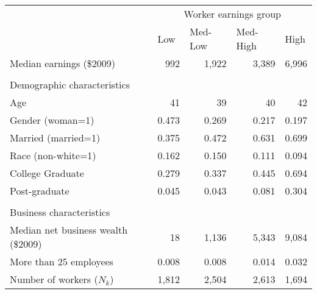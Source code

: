\begin{tabular}{lrrrr}
\toprule
      & \multicolumn{4}{c}{Worker earnings group} \\
\cmidrule{2-5}      & \multicolumn{1}{l}{Low} & \multicolumn{1}{l}{Med-Low} & \multicolumn{1}{l}{Med-High} & \multicolumn{1}{l}{High} \\
\midrule
Median earnings (\$2009) &                  992  &              1,922  &              3,389  &              6,996  \\
      &       &       &       &  \\
Demographic characteristics &       &       &       &  \\
\qquad Age & 41    & 39    & 40    & 42 \\
\qquad Gender (woman=1) & 0.473 & 0.269 & 0.217 & 0.197 \\
\qquad Married (married=1) & 0.375 & 0.472 & 0.631 & 0.699 \\
\qquad Race (non-white=1) & 0.162 & 0.150 & 0.111 & 0.094 \\
\qquad College Graduate & 0.279 & 0.337 & 0.445 & 0.694 \\
\qquad Post-graduate & 0.045 & 0.043 & 0.081 & 0.304 \\
      &       &       &       &  \\
Business characteristics &       &       &       &  \\
\qquad Median net business wealth (\$2009) &                    18  &              1,136  &              5,343  &              9,084  \\
\qquad More than 25 employees & 0.008 & 0.008 & 0.014 & 0.032 \\
\midrule
Number of workers ($N_k$) &              1,812  &              2,504  &              2,613  &              1,694  \\
\bottomrule
\end{tabular}%
